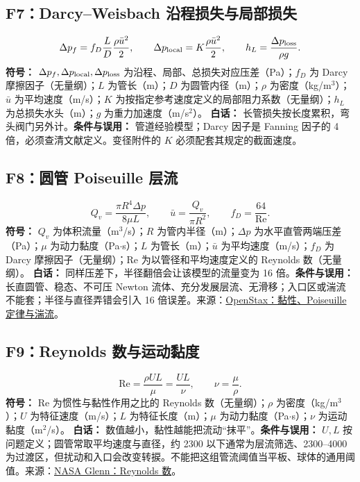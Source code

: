 \subsection{F7：Darcy--Weisbach 沿程损失与局部损失}
\begin{equation}
\Delta p_f=f_D\frac LD\frac{\rho\bar u^2}{2},\qquad \Delta p_{\rm local}=K\frac{\rho\bar u^2}{2},\qquad h_L=\frac{\Delta p_{\rm loss}}{\rho g}.
\end{equation}
\textbf{符号：} $\Delta p_f,\Delta p_{\rm local},\Delta p_{\rm loss}$ 为沿程、局部、总损失对应压差（Pa）；$f_D$ 为 Darcy 摩擦因子（无量纲）；$L$ 为管长（m）；$D$ 为圆管内径（m）；$\rho$ 为密度（kg/m$^3$）；$\bar u$ 为平均速度（m/s）；$K$ 为按指定参考速度定义的局部阻力系数（无量纲）；$h_L$ 为总损失水头（m）；$g$ 为重力加速度（m/s$^2$）。
\textbf{白话：} 长管损失按长度累积，弯头阀门另外计。\textbf{条件与误用：} 管道经验模型；Darcy 因子是 Fanning 因子的 4 倍，必须查清文献定义。变径附件的 $K$ 必须配套其规定的截面速度。

\subsection{F8：圆管 Poiseuille 层流}
\begin{equation}
Q_v=\frac{\pi R^4\Delta p}{8\mu L},\qquad \bar u=\frac{Q_v}{\pi R^2},\qquad f_D=\frac{64}{\mathrm{Re}}.
\end{equation}
\textbf{符号：} $Q_v$ 为体积流量（m$^3$/s）；$R$ 为管内半径（m）；$\Delta p$ 为水平直管两端压差（Pa）；$\mu$ 为动力黏度（Pa$\cdot$s）；$L$ 为管长（m）；$\bar u$ 为平均速度（m/s）；$f_D$ 为 Darcy 摩擦因子（无量纲）；$\mathrm{Re}$ 为以管径和平均速度定义的 Reynolds 数（无量纲）。
\textbf{白话：} 同样压差下，半径翻倍会让该模型的流量变为 16 倍。\textbf{条件与误用：} 长直圆管、稳态、不可压 Newton 流体、充分发展层流、无滑移；入口区或湍流不能套；半径与直径弄错会引入 16 倍误差。来源：\href{https://openstax.org/books/university-physics-volume-1/pages/14-7-viscosity-and-turbulence}{OpenStax：黏性、Poiseuille 定律与湍流}。

\subsection{F9：Reynolds 数与运动黏度}
\begin{equation}
\mathrm{Re}=\frac{\rho UL}{\mu}=\frac{UL}{\nu},\qquad \nu=\frac\mu\rho.
\end{equation}
\textbf{符号：} $\mathrm{Re}$ 为惯性与黏性作用之比的 Reynolds 数（无量纲）；$\rho$ 为密度（kg/m$^3$）；$U$ 为特征速度（m/s）；$L$ 为特征长度（m）；$\mu$ 为动力黏度（Pa$\cdot$s）；$\nu$ 为运动黏度（m$^2$/s）。
\textbf{白话：} 数值越小，黏性越能把流动“抹平”。\textbf{条件与误用：} $U,L$ 按问题定义；圆管常取平均速度与直径，约 2300 以下通常为层流筛选、2300--4000 为过渡区，但扰动和入口会改变转捩。不能把这组管流阈值当平板、球体的通用阈值。来源：\href{https://www.grc.nasa.gov/WWW/k-12/airplane/reynolds.html}{NASA Glenn：Reynolds 数}。

